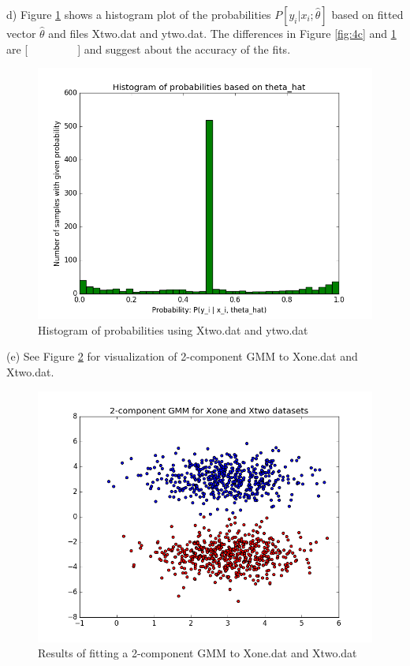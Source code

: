 \documentclass[11pt]{article}
\newenvironment{problem}[2][Problem]{\begin{trivlist}
\item[\hskip \labelsep {\bfseries #1}\hskip \labelsep {\bfseries #2.}]}{\end{trivlist}}
\begin{document}
\begin{problem}{2.4}
(d) Figure \ref{fig:4d} shows a histogram plot of the probabilities $P[y_i | x_i;\hat{\theta}]$  based on fitted vector $\hat{\theta}$ and files Xtwo.dat and ytwo.dat. {\color{red} The differences in Figure \ref{fig:4c} and \ref{fig:4d} are [~~~~~~~~~] and suggest about the accuracy of the fits.}
\begin{figure}[h!]
  \centering
  \includegraphics[scale=0.5]{figs/4d.png}
  \caption{Histogram of probabilities using Xtwo.dat and ytwo.dat}
  \label{fig:4d}
\end{figure}

(e) See Figure \ref{fig:4e} for visualization of 2-component GMM to Xone.dat and Xtwo.dat.
\begin{figure}[h!]
  \centering
  \includegraphics[scale=0.5]{figs/4e.png}
  \caption{Results of fitting a 2-component GMM to Xone.dat and Xtwo.dat}
  \label{fig:4e}
\end{figure}


\end{problem}
\end{document}
